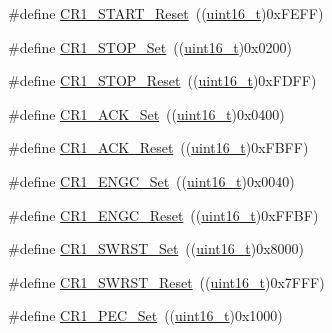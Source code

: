 \begin{DoxyCompactItemize}
\item 
\#define \hyperlink{group___i2_c___private___defines_gacc62242e31a380aec2ef9f836b3cf19d}{C\+R1\+\_\+\+S\+T\+A\+R\+T\+\_\+\+Reset}~((\hyperlink{_p_e___types_8h_a1f1825b69244eb3ad2c7165ddc99c956}{uint16\+\_\+t})0x\+F\+E\+F\+F)
\item 
\#define \hyperlink{group___i2_c___private___defines_gac14ffc5548d2c30d21c49612c57e52be}{C\+R1\+\_\+\+S\+T\+O\+P\+\_\+\+Set}~((\hyperlink{_p_e___types_8h_a1f1825b69244eb3ad2c7165ddc99c956}{uint16\+\_\+t})0x0200)
\item 
\#define \hyperlink{group___i2_c___private___defines_gac44124bc7b468c7dee8188712e407e02}{C\+R1\+\_\+\+S\+T\+O\+P\+\_\+\+Reset}~((\hyperlink{_p_e___types_8h_a1f1825b69244eb3ad2c7165ddc99c956}{uint16\+\_\+t})0x\+F\+D\+F\+F)
\item 
\#define \hyperlink{group___i2_c___private___defines_ga1f74487a0fbffdcd8a4c440c732dc316}{C\+R1\+\_\+\+A\+C\+K\+\_\+\+Set}~((\hyperlink{_p_e___types_8h_a1f1825b69244eb3ad2c7165ddc99c956}{uint16\+\_\+t})0x0400)
\item 
\#define \hyperlink{group___i2_c___private___defines_gaa8bcbe2f6089d896aff8e7770368aada}{C\+R1\+\_\+\+A\+C\+K\+\_\+\+Reset}~((\hyperlink{_p_e___types_8h_a1f1825b69244eb3ad2c7165ddc99c956}{uint16\+\_\+t})0x\+F\+B\+F\+F)
\item 
\#define \hyperlink{group___i2_c___private___defines_gadcd99a681046a2315f4bc72c9f461f0e}{C\+R1\+\_\+\+E\+N\+G\+C\+\_\+\+Set}~((\hyperlink{_p_e___types_8h_a1f1825b69244eb3ad2c7165ddc99c956}{uint16\+\_\+t})0x0040)
\item 
\#define \hyperlink{group___i2_c___private___defines_gab51161052b055a5eecb0aad447a776e5}{C\+R1\+\_\+\+E\+N\+G\+C\+\_\+\+Reset}~((\hyperlink{_p_e___types_8h_a1f1825b69244eb3ad2c7165ddc99c956}{uint16\+\_\+t})0x\+F\+F\+B\+F)
\item 
\#define \hyperlink{group___i2_c___private___defines_ga0e067bb108052ea0e8e49feb194c2ca0}{C\+R1\+\_\+\+S\+W\+R\+S\+T\+\_\+\+Set}~((\hyperlink{_p_e___types_8h_a1f1825b69244eb3ad2c7165ddc99c956}{uint16\+\_\+t})0x8000)
\item 
\#define \hyperlink{group___i2_c___private___defines_gab41b615034ed8f830ef4900a0fcefc39}{C\+R1\+\_\+\+S\+W\+R\+S\+T\+\_\+\+Reset}~((\hyperlink{_p_e___types_8h_a1f1825b69244eb3ad2c7165ddc99c956}{uint16\+\_\+t})0x7\+F\+F\+F)
\item 
\#define \hyperlink{group___i2_c___private___defines_gad0ab853d291338d4cf3aee736353f0b8}{C\+R1\+\_\+\+P\+E\+C\+\_\+\+Set}~((\hyperlink{_p_e___types_8h_a1f1825b69244eb3ad2c7165ddc99c956}{uint16\+\_\+t})0x1000)

\end{DoxyCompactItemize}
